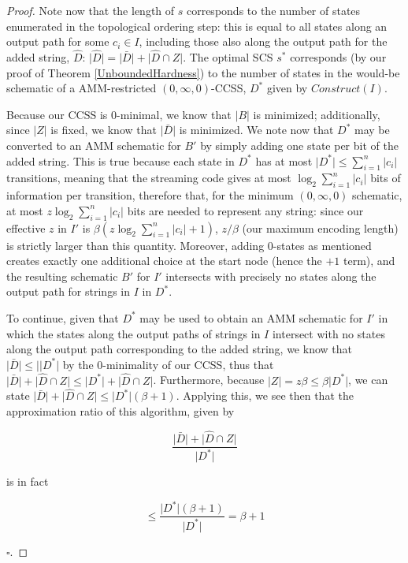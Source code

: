 \documentclass{article}
\theoremstyle{definition}
\begin{document}
\begin{proof}
Note now that the length of $s$ corresponds to the number of states 
enumerated in the topological ordering step: this is equal to all states 
along an output path for some $c_i \in I$, including those also along the output path 
for the added string, $\hat{D}$: $\lvert \hat{D} \rvert = \lvert \bar{D} \rvert + \lvert \hat{D} \cap Z \rvert$.  
The optimal SCS $s^*$ corresponds (by our proof of Theorem \ref{UnboundedHardness}) 
to the number of states in the would-be schematic of a AMM-restricted 
$(0, \infty, 0)$-CCSS, $D^*$ given by $Construct(I)$.

Because our CCSS is 0-minimal, we know that $\lvert B \rvert$ is minimized; 
additionally, since $\lvert Z \rvert$ is fixed, we know that $\lvert \bar{D} \rvert$
is minimized.  We note now that $D^*$ may be converted to an AMM schematic for $B'$ by 
simply adding one state per bit of the added string.  This is true because each state 
in $D^*$ has at most $\lvert D^* \rvert \leq \sum_{i=1}^{n}\lvert c_i \rvert$ transitions, meaning that the streaming code gives at most $\log_2{\sum_{i=1}^{n}\lvert c_i \rvert}$ bits of information per transition, therefore that, for the minimum $(0, \infty, 0)$ schematic, at most $z\log_2{\sum_{i=1}^{n}\lvert c_i \rvert}$ bits are needed
to represent any string: since our effective $z$ in $I'$ is $\beta(z\log_2{\sum_{i=1}^{n}\lvert c_i \rvert}+1)$, $z/\beta$ (our maximum encoding length) is strictly larger than this quantity.
Moreover, adding 0-states as mentioned creates exactly one additional choice 
at the start node (hence the $+1$ term), and the resulting schematic $B'$ for $I'$
intersects with precisely no states along the output path for strings in $I$ in 
$D^*$.  

To continue, given that $D^*$ may be used to obtain an AMM schematic for $I'$ in 
which the states along the output paths of strings in $I$  
intersect with no states along the output path corresponding to the added string, 
we know that 
$\lvert \bar{D} \rvert \leq \lvert \lvert D^* \rvert$ by the $0$-minimality 
of our CCSS, thus that 
$\lvert \bar{D} \rvert + \lvert \hat{D} \cap Z \rvert \leq 
\lvert D^* \rvert + \lvert \hat{D} \cap Z \rvert$.  Furthermore, because 
$\lvert Z \rvert = z\beta \leq \beta \lvert D^* \rvert$, we can state 
$\lvert \bar{D} \rvert + \lvert \hat{D} \cap Z \rvert \leq 
\lvert D^* \rvert(\beta + 1)$.  Applying this, we see then that the approximation ratio 
of this algorithm, given by 

\[ \frac{\lvert \bar{D} \rvert + \lvert \hat{D} \cap Z \rvert}{ \lvert D^* \rvert} \]

\noindent is in fact 

\[ \leq \frac{\lvert D^* \rvert(\beta + 1)}{ \lvert D^* \rvert} = \beta + 1 \]

$\square$.
\end{proof}
\end{document}
